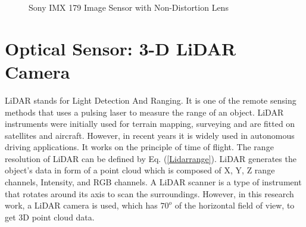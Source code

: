 \begin{figure}
    \centering
    \caption{Sony IMX 179 Image Sensor with Non-Distortion Lens}
    \label{imx179}
\end{figure}

\section{Optical Sensor: 3-D LiDAR Camera}
LiDAR stands for Light Detection And Ranging. It is one of the remote sensing methods that uses a pulsing laser to measure the range of an object. LiDAR instruments were initially used for terrain mapping, surveying and are fitted on satellites and aircraft. However, in recent years it is widely used in autonomous driving applications. It works on the principle of time of flight. The range resolution of LiDAR can be defined by Eq. (\ref{Lidarrange}). LiDAR generates the object's data in form of a point cloud which is composed of X, Y, Z range channels, Intensity, and RGB channels. A LiDAR scanner is a type of instrument that rotates around its axis to scan the surroundings. However, in this research work, a LiDAR camera is used, which has $70^o$ of the horizontal field of view, to get 3D point cloud data.            

